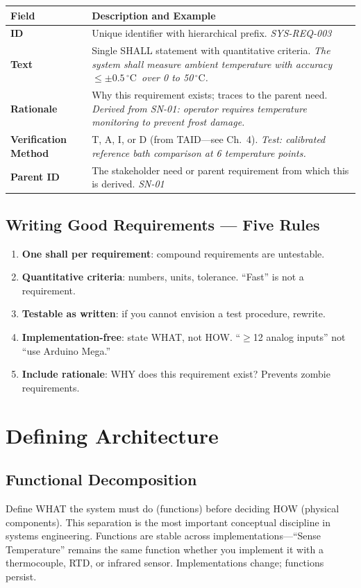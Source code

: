 \documentclass[11pt,letterpaper,twoside,openany]{book}
\newcommand{\degC}{\ensuremath{{}^{\circ}\text{C}}}
\begin{document}
\begin{center}
\small
\begin{tabularx}{\textwidth}{l X}
\toprule
\textbf{Field} & \textbf{Description and Example} \\
\midrule
\textbf{ID} & Unique identifier with hierarchical prefix. \emph{SYS-REQ-003} \\
\textbf{Text} & Single SHALL statement with quantitative criteria. \emph{The system shall measure ambient temperature with accuracy $\leq \pm 0.5$\,\degC\ over 0 to 50\,\degC.} \\
\textbf{Rationale} & Why this requirement exists; traces to the parent need. \emph{Derived from SN-01: operator requires temperature monitoring to prevent frost damage.} \\
\textbf{Verification Method} & T, A, I, or D (from TAID---see Ch.~4). \emph{Test: calibrated reference bath comparison at 6 temperature points.} \\
\textbf{Parent ID} & The stakeholder need or parent requirement from which this is derived. \emph{SN-01} \\
\bottomrule
\end{tabularx}
\end{center}

\subsection{Writing Good Requirements --- Five Rules}
\begin{enumerate}[leftmargin=1.5em]
\item \textbf{One shall per requirement}: compound requirements are untestable.
\item \textbf{Quantitative criteria}: numbers, units, tolerance. ``Fast'' is not a requirement.
\item \textbf{Testable as written}: if you cannot envision a test procedure, rewrite.
\item \textbf{Implementation-free}: state WHAT, not HOW. ``$\geq$12 analog inputs'' not ``use Arduino Mega.''
\item \textbf{Include rationale}: WHY does this requirement exist? Prevents zombie requirements.
\end{enumerate}

\FloatBarrier
\section{Defining Architecture}
\subsection{Functional Decomposition}
Define WHAT the system must do (functions) before deciding HOW (physical components). This separation is the most important conceptual discipline in systems engineering. Functions are stable across implementations---``Sense Temperature'' remains the same function whether you implement it with a thermocouple, RTD, or infrared sensor. Implementations change; functions persist.
\end{document}
